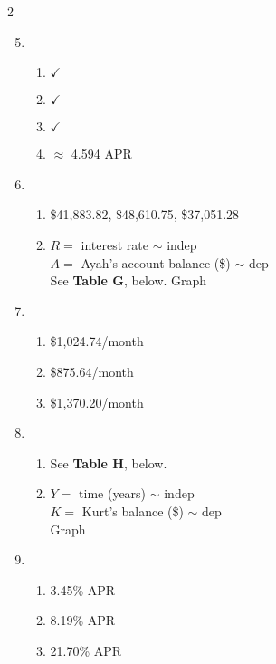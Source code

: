 \begin{multicols} {2}
\begin{enumerate}
\setcounter{enumi}{4}

\item %
\begin{enumerate}
\item $\checkmark$
\item $\checkmark$
\item $\checkmark$
\item $\approx$ 4.594 APR
\end{enumerate}

\item %
\begin{enumerate}
\item  \$41,883.82, \$48,610.75, \$37,051.28
\item $R=$ interest rate $\sim$ indep \\ $A=$ Ayah's account balance (\$) $\sim$ dep \\
See \textbf{Table G}, below.  Graph
\end{enumerate}

\item %
\begin{enumerate}
\item \$1,024.74/month
\item \$875.64/month
\item \$1,370.20/month
\end{enumerate}

\item %
\begin{enumerate}
\item See \textbf{Table H}, below.  
\item $Y=$ time (years) $\sim$ indep \\ $K=$ Kurt's balance (\$) $\sim$ dep \\Graph
\end{enumerate}

\item %
\begin{enumerate}
\item 3.45\% APR
\item 8.19\% APR
\item 21.70\% APR
\end{enumerate}

\end{enumerate}
\end{multicols}


